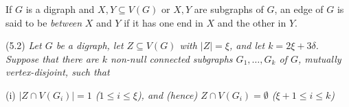 If $G$ is a digraph and $X, Y \subseteq V(G)$ or $X, Y$ are subgraphs of $G$, an edge of $G$ is said to be \textit{between} $X$ and $Y$ if it has one end in $X$ and the other in $Y$.

\stmt
(5.2) \textit{Let $G$ be a digraph, let $Z \subseteq V(G)$ with $|Z| = \xi$, and let $k = 2\xi + 3\delta$. Suppose that there are $k$ non-null connected subgraphs $G_1, \dots, G_k$ of $G$, mutually vertex-disjoint, such that}

\hspace*{12pt}(i) \textit{$|Z \cap V(G_i)| = 1$ ($1 \le i \le \xi$), and (hence) $Z \cap V(G_i) = \emptyset$ ($\xi + 1 \le i \le k$)}
